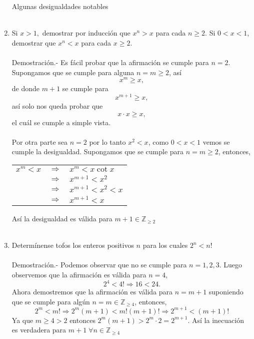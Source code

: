 \begin{enumerate}[ \bfseries 1.]
Algunas desigualdades notables\\\\
\item Si $x>1,$ demostrar por inducción que $x^n >x$ para cada $n\geq 2.$ Si $0<x<1$, demostrar que $x^n<x$ para cada $x \geq 2.$\\\\
Demostración.- \; Es fácil probar que la afirmación se cumple para $n=2$. Supongamos que se cumple para alguna $n=m \geq 2$, así $$x^m \geq x,$$ de donde $m+1$ se cumple para $$x^{m+1}\geq x,$$ así solo nos queda probar que $$x \cdot x \geq x,$$ el cuál se cumple a simple vista.\\\\
Por otra parte sea $n=2$ por lo tanto $x^2<x$, como $0<x<1$ vemos se cumple la desigualdad. Supongamos que se cumple para $n=m \geq 2$, entonces,
\begin{center}
\begin{tabular}{rcl}
$x^m<x$&$\Rightarrow$&$x^m < x\cot x$\\
&$\Rightarrow$&$x^{m+1}<x^2$\\
&$\Rightarrow$&$x^{m+1}<x^2<x$\\
&$\Rightarrow$&$x^{m+1}<x$\\
\end{tabular}
\end{center}
Así la desigualdad es válida para $m+1 \in \mathbb{Z}_{\geq 2}$\\\\


\item Determínense tofos los enteros positivos $n$ para los cuales $2^n < n!$\\\\
Demostración.- \; Podemos observar que no se cumple para $n=1,2,3$. Luego observemos que la afirmación es válida para $n=4$,   $$2^4 < 4! \Rightarrow 16<24.$$
Ahora demostremos que la afirmación es válida para $n=m+1$ suponiendo que se cumple para algún $n=m \in \mathbb{Z}_{\geq 4}$, entonces,
$$2^m < m! \Longrightarrow 2^{m} (m+1) < m! (m+1)! \Longrightarrow 2^{m+1} < (m+1)! $$
Ya que $m\geq 4 > 2$ entonces $2^m(m+1) > 2^m \cdot 2 = 2^{m+1}$. Así la inecuación es verdadera para $m+1 \; \forall n \in \mathbb{Z}_{\geq 4}$\\\\


\end{enumerate}
